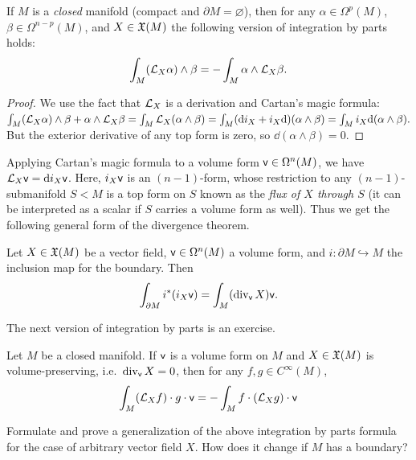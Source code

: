 \begin{cor}
    If $M$ is a \emph{closed} manifold (compact and $\partial M=\varnothing$), then for any $\alpha\in\Omega^p(M)$, $\beta\in\Omega^{n-p}(M)$, and $X\in\mathfrak{X}(M)$ the following version of integration by parts holds:
    \[\int_M (\mathcal{L}_X \alpha)\wedge\beta=-\int_M \alpha\wedge\mathcal{L}_X\beta.\]
\end{cor}
\begin{proof}
    We use the fact that $\mathcal{L}_X$ is a derivation and Cartan's magic formula:
    $\int_M (\mathcal{L}_X\alpha)\wedge\beta+\alpha\wedge\mathcal{L}_X\beta=\int_M \mathcal{L}_X (\alpha\wedge\beta)=\int_M ({\mathrm{d}} i_X+i_X{\mathrm{d}})(\alpha\wedge\beta)=\int_M i_X {\mathrm{d}}(\alpha\wedge\beta).$
    But the exterior derivative of any top form is zero, so $\dd(\alpha\wedge\beta)=0$.
\end{proof}
Applying Cartan's magic formula to a volume form $\mathsf{v}\in\Omega^n(M)$, we have $\mathcal{L}_X\mathsf{v}={\mathrm{d}} i_X\mathsf{v}$. Here, $i_X\mathsf{v}$ is an $(n-1)$-form, whose restriction to any $(n-1)$-submanifold $S<M$ is a top form on $S$ known as the \emph{flux of $X$ through $S$} (it can be interpreted as a scalar if $S$ carries a volume form as well). Thus we get the following general form of the divergence theorem.
\begin{cor}
    Let $X\in\mathfrak{X}(M)$ be a vector field, $\mathsf{v}\in\Omega^n(M)$ a volume form, and $i:\partial M\hookrightarrow M$ the inclusion map for the boundary. Then 
    \[\int_{\partial M}i^\ast(i_X\mathsf{v})=\int_M (\operatorname{div}_{\mathsf{v}}X)\mathsf{v}.\]
\end{cor}
The next version of integration by parts is an exercise.
\begin{cor}
    Let $M$ be a closed manifold. If $\mathsf{v}$ is a volume form on $M$ and $X\in\mathfrak{X}(M)$ is volume-preserving, i.e.\ $\operatorname{div}_{\mathsf{v}} X=0$, then for any $f,g\in C^\infty(M)$,
    \[\int_M (\mathcal{L}_Xf)\cdot g\cdot \mathsf{v}=-\int_M f\cdot (\mathcal{L}_Xg)\cdot \mathsf{v}\]
\end{cor}
\begin{xca}
    Formulate and prove a generalization of the above  integration by parts formula for the case of arbitrary vector field $X$. How does it change if $M$ has a boundary?
\end{xca}

